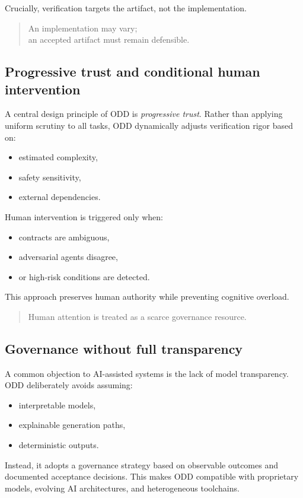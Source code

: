 \documentclass[conference]{IEEEtran}
\begin{document}
Crucially, verification targets the artifact, not the implementation.
\begin{quote}
An implementation may vary;\\
an accepted artifact must remain defensible.
\end{quote}

\subsection{Progressive trust and conditional human intervention}
A central design principle of ODD is \emph{progressive trust}. Rather than applying uniform scrutiny to all tasks, ODD dynamically adjusts verification rigor based on:
\begin{itemize}
\item estimated complexity,
\item safety sensitivity,
\item external dependencies.
\end{itemize}

Human intervention is triggered only when:
\begin{itemize}
\item contracts are ambiguous,
\item adversarial agents disagree,
\item or high-risk conditions are detected.
\end{itemize}

This approach preserves human authority while preventing cognitive overload.
\begin{quote}
Human attention is treated as a scarce governance resource.
\end{quote}

\subsection{Governance without full transparency}
A common objection to AI-assisted systems is the lack of model transparency. ODD deliberately avoids assuming:
\begin{itemize}
\item interpretable models,
\item explainable generation paths,
\item deterministic outputs.
\end{itemize}

Instead, it adopts a governance strategy based on observable outcomes and documented acceptance decisions. This makes ODD compatible with proprietary models, evolving AI architectures, and heterogeneous toolchains.
\end{document}
